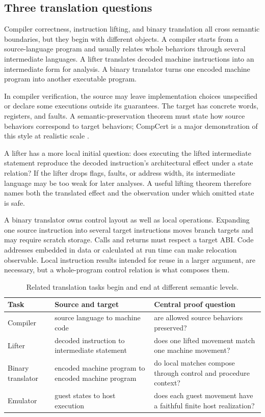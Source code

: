 \subsection{Three translation questions}

Compiler correctness, instruction lifting, and binary translation all cross
semantic boundaries, but they begin with different objects. A compiler starts
from a source-language program and usually relates whole behaviors through
several intermediate languages. A lifter translates decoded machine
instructions into an intermediate form for analysis. A binary translator
turns one encoded machine program into another executable program.

In compiler verification, the source may leave implementation choices unspecified or
declare some executions outside its guarantees. The target has concrete words,
registers, and faults. A semantic-preservation theorem must state how source
behaviors correspond to target behaviors; CompCert is a major demonstration of
this style at realistic scale \autocite{leroy2009compcert}.

A lifter has a more local initial question: does executing the lifted
intermediate statement reproduce the decoded instruction's architectural
effect under a state relation? If the lifter drops flags, faults, or address
width, its intermediate language may be too weak for later analyses. A useful
lifting theorem therefore names both the translated effect and the observation
under which omitted state is safe.

A binary translator owns control layout as well as local operations. Expanding
one source instruction into several target instructions moves branch targets
and may require scratch storage. Calls and returns must respect a target ABI.
Code addresses embedded in data or calculated at run time can make relocation
observable. Local instruction results intended for reuse in a
larger argument, are necessary, but a whole-program
control relation is what composes them.

\begin{table}[htbp]
\centering
\caption{Related translation tasks begin and end at different semantic levels.}
\begin{tabular}{@{}p{}p{}p{}@{}}
\toprule
Task & Source and target & Central proof question \\
\midrule
Compiler & source language to machine code & are allowed source behaviors preserved? \\
Lifter & decoded instruction to intermediate statement & does one lifted movement match one machine movement? \\
Binary translator & encoded machine program to encoded machine program & do local matches compose through control and procedure context? \\
Emulator & guest states to host execution & does each guest movement have a faithful finite host realization? \\
\bottomrule
\end{tabular}
\end{table}

